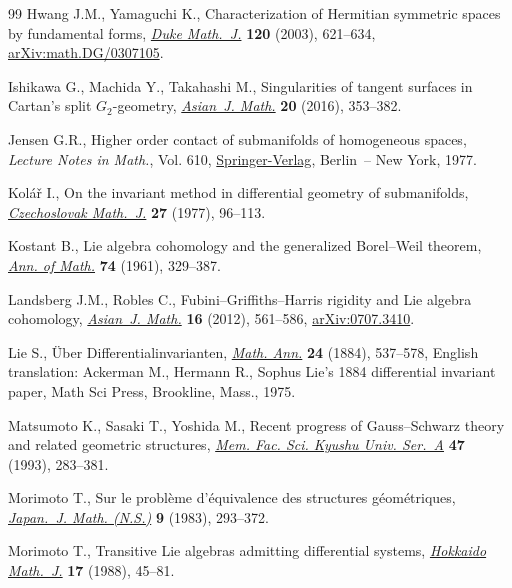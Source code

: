 \begin{thebibliography}{99}
Hwang J.M., Yamaguchi K., Characterization of {H}ermitian symmetric spaces by
 fundamental forms, \href{https://doi.org/10.1215/S0012-7094-03-12035-9}{\textit{Duke Math.~J.}} \textbf{120} (2003), 621--634,
 \href{https://arxiv.org/abs/math.DG/0307105}{arXiv:math.DG/0307105}.

Ishikawa G., Machida Y., Takahashi M., Singularities of tangent surfaces in
 {C}artan's split {$G_2$}-geometry, \href{https://doi.org/10.4310/AJM.2016.v20.n2.a6}{\textit{Asian~J. Math.}} \textbf{20}
 (2016), 353--382.

Jensen G.R., Higher order contact of submanifolds of homogeneous spaces,
 \textit{Lecture Notes in Math.}, Vol. 610, \href{https://doi.org/10.1007/BFb0068415}{Springer-Verlag}, Berlin~-- New
 York, 1977.

Kol\'a\v{r} I., On the invariant method in differential geometry of
 submanifolds, \href{https://doi.org/10.21136/CMJ.1977.101448}{\textit{Czechoslovak Math.~J.}} \textbf{27} (1977), 96--113.

Kostant B., Lie algebra cohomology and the generalized {B}orel--{W}eil theorem,
 \href{https://doi.org/10.2307/1970237}{\textit{Ann. of Math.}} \textbf{74} (1961), 329--387.

Landsberg J.M., Robles C., Fubini--{G}riffiths--{H}arris rigidity and {L}ie
 algebra cohomology, \href{https://doi.org/10.4310/AJM.2012.v16.n4.a1}{\textit{Asian~J. Math.}} \textbf{16} (2012), 561--586,
 \href{https://arxiv.org/abs/0707.3410}{arXiv:0707.3410}.

Lie S., \"Uber Differentialinvarianten, \href{https://doi.org/10.1007/BF01447449}{\textit{Math. Ann.}} \textbf{24} (1884),
 537--578, {E}nglish translation: Ackerman M., Hermann R., Sophus Lie's 1884
 differential invariant paper, Math Sci Press, Brookline, Mass., 1975.

Matsumoto K., Sasaki T., Yoshida M., Recent progress of {G}auss--{S}chwarz
 theory and related geometric structures, \href{https://doi.org/10.2206/kyushumfs.47.283}{\textit{Mem. Fac. Sci. Kyushu Univ.
 Ser.~A}} \textbf{47} (1993), 283--381.

Morimoto T., Sur le probl\`eme d'\'equivalence des structures g\'eom\'etriques,
 \href{https://doi.org/10.4099/math1924.9.293}{\textit{Japan.~J. Math. (N.S.)}} \textbf{9} (1983), 293--372.

Morimoto T., Transitive {L}ie algebras admitting differential systems,
 \href{https://doi.org/10.14492/hokmj/1381517794}{\textit{Hokkaido Math.~J.}} \textbf{17} (1988), 45--81.


\end{thebibliography}
